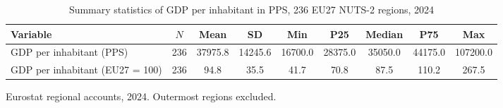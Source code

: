 \begin{table}[t]
\centering
\begin{threeparttable}
\caption{Summary statistics of GDP per inhabitant in PPS, 236 EU27 NUTS-2 regions, 2024}
\label{tab:summary}
\begin{tabular}{lcccccccc}
\toprule
Variable & $N$ & Mean & SD & Min & P25 & Median & P75 & Max \\
\midrule
GDP per inhabitant (PPS) & 236 & 37975.8 & 14245.6 & 16700.0 & 28375.0 & 35050.0 & 44175.0 & 107200.0 \\
GDP per inhabitant (EU27 = 100) & 236 & 94.8 & 35.5 & 41.7 & 70.8 & 87.5 & 110.2 & 267.5 \\
\bottomrule
\end{tabular}
\begin{tablenotes}[flushleft]
\footnotesize
\item Eurostat regional accounts, 2024. Outermost regions excluded.
\end{tablenotes}
\end{threeparttable}
\end{table}

